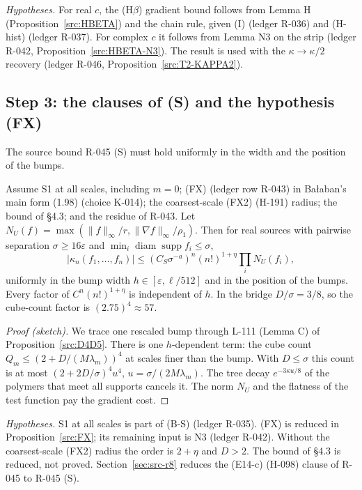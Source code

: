 \emph{Hypotheses.} For real $c$, the (H$\beta$) gradient bound follows from Lemma H (Proposition~\ref{src:HBETA}) and the chain rule, given (I) (ledger R-036) and (H-hist) (ledger R-037). For complex $c$ it follows from Lemma N3 on the strip (ledger R-042, Proposition~\ref{src:HBETA-N3}). The result is used with the $\kappa\to\kappa/2$ recovery (ledger R-046, Proposition~\ref{src:T2-KAPPA2}).

\subsection{Step 3: the clauses of (S) and the hypothesis (FX)}\label{sec:src-FX}

The source bound R-045 (S) must hold uniformly in the width and the position of the bumps.

\begin{proposition}\label{src:B21-S}
Assume S1 at all scales, including $m=0$; (FX) (ledger row R-043) in Ba{\l}aban's main form (1.98) (choice K-014); the coarsest-scale (FX2) (H-191) radius; the bound of  \S4.3; and the residue of R-043. Let $N_U(f)=\max(\|f\|_\infty/r,\|\nabla f\|_\infty/\rho_1)$. Then for real sources with pairwise separation $\sigma\ge16\varepsilon$ and $\min_i\operatorname{diam}\operatorname{supp}f_i\le\sigma$,
\[|\kappa_n(f_1,\dots,f_n)|\le(C_S\sigma^{-a})^n(n!)^{1+\eta}\prod_iN_U(f_i),\]
uniformly in the bump width $h\in[\varepsilon,\ell/512]$ and in the position of the bumps. Every factor of $C^n(n!)^{1+\eta}$ is independent of $h$. In the bridge $D/\sigma=3/8$, so the cube-count factor is $(2.75)^4\approx57$.
\end{proposition}
\begin{proof}[Proof (sketch)]
We trace one rescaled bump through L-111 (Lemma C) of Proposition~\ref{src:D4D5}. There is one $h$-dependent term: the cube count $Q_m\le(2+D/(M\lambda_m))^4$ at scales finer than the bump. With $D\le\sigma$ this count is at most $(2+2D/\sigma)^4u^4$, $u=\sigma/(2M\lambda_m)$. The tree decay $e^{-3\kappa u/8}$ of the polymers that meet all supports cancels it. The norm $N_U$ and the flatness of the test function pay the gradient cost.
\end{proof}
\emph{Hypotheses.} S1 at all scales is part of (B-S) (ledger R-035). (FX) is reduced in Proposition~\ref{src:FX}; its remaining input is N3 (ledger R-042). Without the coarsest-scale (FX2) radius the order is $2+\eta$ and $D>2$. The bound of  \S4.3 is reduced, not proved. Section~\ref{sec:src-r8} reduces the (E14-c) (H-098) clause of R-045 to R-045 (S).

